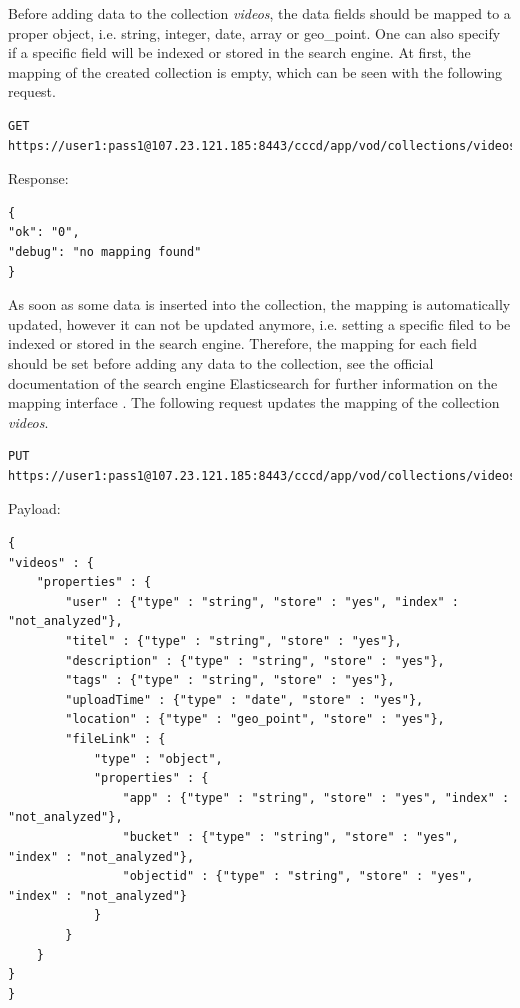 Before adding data to the collection \textit{videos}, the data fields should be mapped to a proper object, i.e. string, integer, date, array or geo\_point. One can also specify if a specific field will be indexed or stored in the search engine. At first, the mapping of the created collection is empty, which can be seen with the following request.

\begin{code}
\begin{verbatim}
GET https://user1:pass1@107.23.121.185:8443/cccd/app/vod/collections/videos/mapping
\end{verbatim}
Response:
\begin{verbatim}
{
"ok": "0",
"debug": "no mapping found"
}
\end{verbatim}
\end{code}

As soon as some data is inserted into the collection, the mapping is automatically updated, however it can not be updated anymore, i.e. setting a specific filed to be indexed or stored in the search engine. Therefore, the mapping for each field should be set before adding any data to the collection, see the official documentation of the search engine Elasticsearch for further information on the mapping interface \cite{elastic_mapping}. The following request updates the mapping of the collection \textit{videos}.

\begin{code}
\begin{verbatim}
PUT https://user1:pass1@107.23.121.185:8443/cccd/app/vod/collections/videos/mapping
\end{verbatim}
Payload:
\begin{verbatim}
{
"videos" : {
	"properties" : {
		"user" : {"type" : "string", "store" : "yes", "index" : "not_analyzed"},
		"titel" : {"type" : "string", "store" : "yes"},
		"description" : {"type" : "string", "store" : "yes"},
		"tags" : {"type" : "string", "store" : "yes"},
		"uploadTime" : {"type" : "date", "store" : "yes"},
		"location" : {"type" : "geo_point", "store" : "yes"},
		"fileLink" : {
			"type" : "object",
			"properties" : {
				"app" : {"type" : "string", "store" : "yes", "index" : "not_analyzed"},
				"bucket" : {"type" : "string", "store" : "yes", "index" : "not_analyzed"},
				"objectid" : {"type" : "string", "store" : "yes", "index" : "not_analyzed"}
			}
		}
	}
}
}
\end{verbatim}
\end{code}

